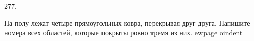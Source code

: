277. \begin{center}
\begin{figure}[ht!]
\end{figure}
\end{center}
На полу лежат четыре прямоугольных ковра, перекрывая друг друга. Напишите номера всех областей, которые покрыты ровно тремя из них.
ewpage
oindent
